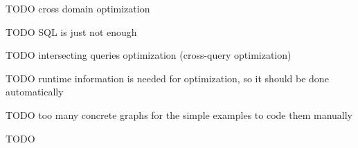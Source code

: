 TODO cross domain optimization

TODO SQL is just not enough

TODO intersecting queries optimization (cross-query optimization)

TODO runtime information is needed for optimization, so it should be done automatically

TODO too many concrete graphs for the simple examples to code them manually

TODO
